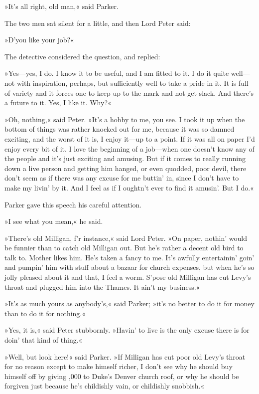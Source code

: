 »It's all right, old man,« said Parker.

The two men sat silent for a little, and then Lord Peter said:

»D'you like your job?«

The detective considered the question, and replied:

»Yes—yes, I do. I know it to be useful, and I am fitted to it. I do it quite well—not with inspiration, perhaps, but sufficiently well to take a pride in it. It is full of variety and it forces one to keep up to the mark and not get slack. And there's a future to it. Yes, I like it. Why?«

»Oh, nothing,« said Peter. »It's a hobby to me, you see. I took it up when the bottom of things was rather knocked out for me, because it was so damned exciting, and the worst of it is, I enjoy it—up to a point. If it was all on paper I'd enjoy every bit of it. I love the beginning of a job—when one doesn't know any of the people and it's just exciting and amusing. But if it comes to really running down a live person and getting him hanged, or even quodded, poor devil, there don't seem as if there was any excuse for me buttin' in, since I don't have to make my livin' by it. And I feel as if I oughtn't ever to find it amusin'. But I do.«

Parker gave this speech his careful attention.

»I see what you mean,« he said.

»There's old Milligan, f'r instance,« said Lord Peter. »On paper, nothin' would be funnier than to catch old Milligan out. But he's rather a decent old bird to talk to. Mother likes him. He's taken a fancy to me. It's awfully entertainin' goin' and pumpin' him with stuff about a bazaar for church expenses, but when he's so jolly pleased about it and that, I feel a worm. S'pose old Milligan has cut Levy's throat and plugged him into the Thames. It ain't my business.«

»It's as much yours as anybody's,« said Parker; »it's no better to do it for money than to do it for nothing.«

»Yes, it is,« said Peter stubbornly. »Havin' to live is the only excuse there is for doin' that kind of thing.«

»Well, but look here!« said Parker. »If Milligan has cut poor old Levy's throat for no reason except to make himself richer, I don't see why he should buy himself off by giving ,000 to Duke's Denver church roof, or why he should be forgiven just because he's childishly vain, or childishly snobbish.«

